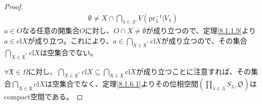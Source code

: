 \documentclass[dvipdfmx]{jsarticle}
\begin{document}
\begin{proof}
\begin{align*}
\emptyset \neq X \cap \bigcap_{\lambda \in \varLambda' } {V\left( {\mathrm{pr}}_{\lambda}^{- 1}|V_{\lambda} \right)}
\end{align*}
$a \in O$なる任意の開集合$O$に対し、$O \cap X \neq \emptyset$が成り立つので、定理\ref{8.1.1.9}より$a \in {\mathrm{cl}}X$が成り立つ。これにより、$a \in \bigcap_{X \in \mathfrak{X}^{*}} {{\mathrm{cl}}X}$が成り立つので、その集合$\bigcap_{X \in \mathfrak{X}^{*}} {{\mathrm{cl}}X}$は空集合でない。\par
$\mathfrak{\forall X \in}\varOmega$に対し、$\bigcap_{X \in \mathfrak{X}^{*}} {{\mathrm{cl}}X} \subseteq \bigcap_{X \in \mathfrak{X}} {{\mathrm{cl}}X}$が成り立つことに注意すれば、その集合$\bigcap_{X \in \mathfrak{X}} {{\mathrm{cl}}X}$は空集合でなく、定理\ref{8.1.6.1}よりその位相空間$\left( \prod_{\lambda \in \varLambda} S_{\lambda},\mathfrak{O} \right)$はcompact空間である。
\end{proof}
\end{document}

